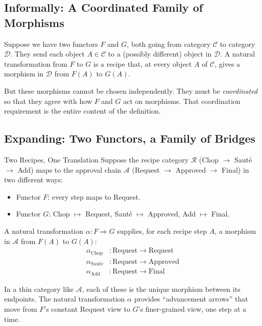 \subsection{Informally: A Coordinated Family of Morphisms}

Suppose we have two functors $F$ and $G$, both going from category
$\mathcal{C}$ to category $\mathcal{D}$. They send each object $A \in
\mathcal{C}$ to a (possibly different) object in $\mathcal{D}$. A natural
transformation from $F$ to $G$ is a recipe that, at every object $A$ of
$\mathcal{C}$, gives a morphism in $\mathcal{D}$ from $F(A)$ to $G(A)$.

But these morphisms cannot be chosen independently. They must be
\emph{coordinated} so that they agree with how $F$ and $G$ act on
morphisms. That coordination requirement is the entire content of the
definition.

\subsection{Expanding: Two Functors, a Family of Bridges}

\begin{example}{Two Recipes, One Translation}
Suppose the recipe category $\mathcal{R}$ (Chop $\to$ Sauté $\to$ Add) maps
to the approval chain $\mathcal{A}$ (Request $\to$ Approved $\to$ Final) in
two different ways:
\begin{itemize}
  \item Functor $F$: every step maps to Request.
  \item Functor $G$: Chop $\mapsto$ Request, Sauté $\mapsto$ Approved,
        Add $\mapsto$ Final.
\end{itemize}

A natural transformation $\alpha : F \Rightarrow G$ supplies, for each recipe
step $A$, a morphism in $\mathcal{A}$ from $F(A)$ to $G(A)$:
\begin{align*}
  \alpha_{\mathrm{Chop}} &: \mathrm{Request} \to \mathrm{Request} \\
  \alpha_{\mathrm{Saut\acute{e}}} &: \mathrm{Request} \to \mathrm{Approved} \\
  \alpha_{\mathrm{Add}}  &: \mathrm{Request} \to \mathrm{Final}
\end{align*}

In a thin category like $\mathcal{A}$, each of these is the unique morphism
between its endpoints. The natural transformation $\alpha$ provides
``advancement arrows'' that move from $F$'s constant Request view to $G$'s
finer-grained view, one step at a time.
\end{example}

